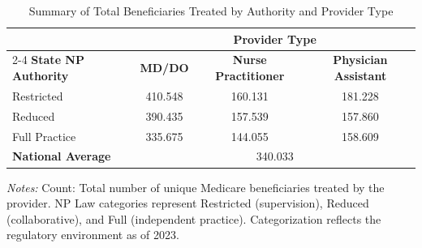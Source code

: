 \begin{table}[htbp]
    \centering
    \caption{Summary of Total Beneficiaries Treated by Authority and Provider Type}
    \label{tab:tot_benes_provtype}
    \vspace{0.2cm}
    \begin{tabular}{lccc}
        \toprule
        & \multicolumn{3}{c}{\textbf{Provider Type}} \\
        \cmidrule(lr){2-4}
        \textbf{State NP Authority} & \textbf{MD/DO} & \textbf{Nurse Practitioner} & \textbf{Physician Assistant} \\
        \midrule
        Restricted & 410.548 & 160.131 & 181.228 \\
        Reduced & 390.435 & 157.539 & 157.860 \\
        Full Practice & 335.675 & 144.055 & 158.609 \\
        \midrule
        \textbf{National Average} & \multicolumn{3}{c}{340.033} \\
        \bottomrule
    \end{tabular}
    \vspace{0.1cm}
    \begin{minipage}{0.85\textwidth}
        \footnotesize \textit{Notes:} Count: Total number of unique Medicare beneficiaries treated by the provider. NP Law categories represent Restricted (supervision), Reduced (collaborative), and Full (independent practice). Categorization reflects the regulatory environment as of 2023.
    \end{minipage}
\end{table}